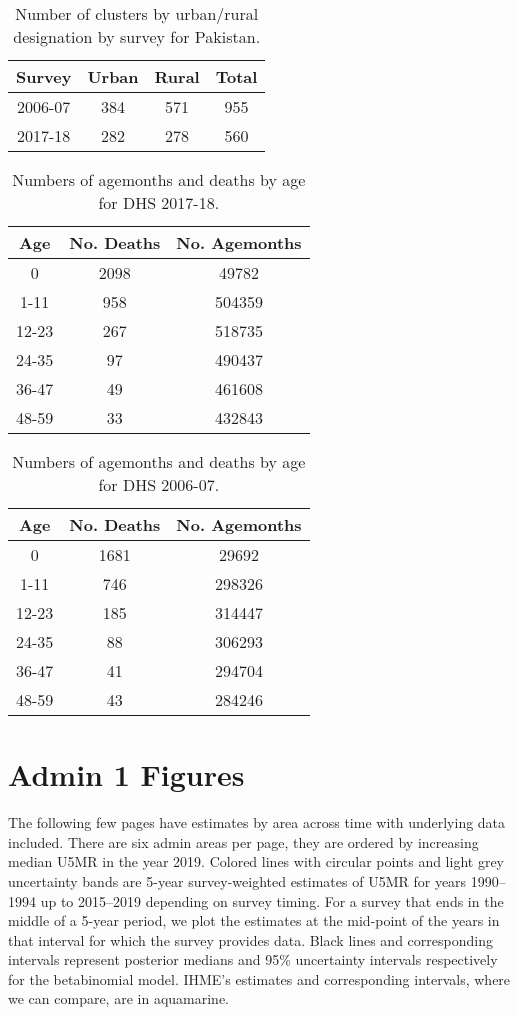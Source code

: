 \documentclass[]{article}
\begin{document}
\begin{table}[ht]
\centering
\begin{tabular}{cccc}
  \hline
Survey & Urban & Rural & Total \\ 
  \hline
2006-07 & 384 & 571 & 955 \\ 
  2017-18 & 282 & 278 & 560 \\ 
   \hline
\end{tabular}
\caption{Number of clusters by urban/rural designation by survey for Pakistan.} 
\end{table}
\begin{table}[!ht]
\centering
\begin{tabular}{ccc}
  \hline
Age & No. Deaths & No. Agemonths \\ 
  \hline
0 & 2098 & 49782 \\ 
  1-11 & 958 & 504359 \\ 
  12-23 & 267 & 518735 \\ 
  24-35 & 97 & 490437 \\ 
  36-47 & 49 & 461608 \\ 
  48-59 & 33 & 432843 \\ 
   \hline
\end{tabular}
\caption{Numbers of agemonths and deaths by age for DHS 2017-18.} 
\end{table}
\begin{table}[!ht]
\centering
\begin{tabular}{ccc}
  \hline
Age & No. Deaths & No. Agemonths \\ 
  \hline
0 & 1681 & 29692 \\ 
  1-11 & 746 & 298326 \\ 
  12-23 & 185 & 314447 \\ 
  24-35 & 88 & 306293 \\ 
  36-47 & 41 & 294704 \\ 
  48-59 & 43 & 284246 \\ 
   \hline
\end{tabular}
\caption{Numbers of agemonths and deaths by age for DHS 2006-07.} 
\end{table}

\clearpage

\hypertarget{admin-1-figures}{%
\section{Admin 1 Figures}\label{admin-1-figures}}

The following few pages have estimates by area across time with
underlying data included. There are six admin areas per page, they are
ordered by increasing median U5MR in the year 2019. Colored lines with
circular points and light grey uncertainty bands are 5-year
survey-weighted estimates of U5MR for years 1990--1994 up to 2015--2019
depending on survey timing. For a survey that ends in the middle of a
5-year period, we plot the estimates at the mid-point of the years in
that interval for which the survey provides data. Black lines and
corresponding intervals represent posterior medians and 95\% uncertainty
intervals respectively for the betabinomial model. IHME's estimates and
corresponding intervals, where we can compare, are in aquamarine.
\end{document}
